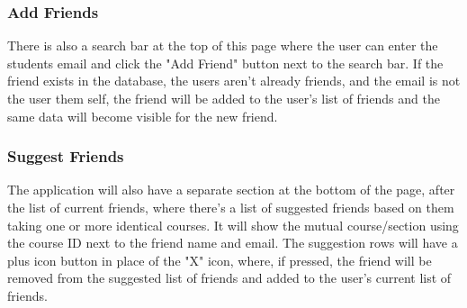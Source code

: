 \documentclass[12pt, a4paper]{article}
\begin{document}
\subsubsection*{Add Friends}
There is also a search bar at the top of this page where the user can enter the students email and click the "Add Friend" button next to the search bar. If the friend exists in the database, the users aren't already friends, and the email is not the user them self, the friend will be added to the user's list of friends and the same data will become visible for the new friend.
\subsubsection*{Suggest Friends}
The application will also have a separate section at the bottom of the page, after the list of current friends, where there's a list of suggested friends based on them taking one or more identical courses. It will show the mutual course/section using the course ID next to the friend name and email. The suggestion rows will have a plus icon button in place of the "X" icon, where, if pressed, the friend will be removed from the suggested list of friends and added to the user's current list of friends.
\end{document}
